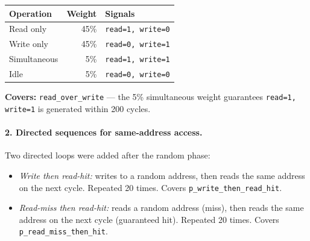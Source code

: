 \documentclass[11pt]{article}
\begin{document}
\begin{center}
\begin{tabular}{lrl}
  \toprule
  Operation & Weight & Signals \\
  \midrule
  Read only    & 45\% & \texttt{read=1, write=0} \\
  Write only   & 45\% & \texttt{read=0, write=1} \\
  Simultaneous &  5\% & \texttt{read=1, write=1} \\
  Idle         &  5\% & \texttt{read=0, write=0} \\
  \bottomrule
\end{tabular}
\end{center}

\textbf{Covers:} \texttt{read\_over\_write} --- the 5\% simultaneous weight guarantees \texttt{read=1, write=1} is generated within 200 cycles.

\paragraph*{2. Directed sequences for same-address access.}
Two directed loops were added after the random phase:

\begin{itemize}
  \item \textit{Write then read-hit:} writes to a random address, then reads the same address on the next cycle. Repeated 20 times. Covers \texttt{p\_write\_then\_read\_hit}.
  \item \textit{Read-miss then read-hit:} reads a random address (miss), then reads the same address on the next cycle (guaranteed hit). Repeated 20 times. Covers \texttt{p\_read\_miss\_then\_hit}.
\end{itemize}
\end{document}
